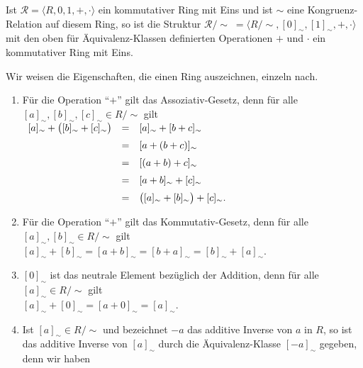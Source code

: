\begin{Satz} \label{satz:faktor_ring} 
  Ist $\mathcal{R} = \langle R, 0, 1, +, \cdot \rangle$ ein kommutativer Ring mit Eins und ist
  $\sim$ eine Kongruenz-Relation auf diesem Ring, so ist die Struktur 
  $\mathcal{R}/\!\!\sim\; = \langle R/\!\sim, [0]_\sim, [1]_\sim, +, \cdot \rangle$
  mit den oben für Äquivalenz-Klassen definierten Operationen $+$ und $\cdot$ ein kommutativer 
  Ring mit Eins. 
\end{Satz}

\proof
Wir weisen die Eigenschaften, die einen Ring auszeichnen, einzeln nach.
\begin{enumerate}
\item Für die Operation ``$+$'' gilt das Assoziativ-Gesetz, denn für alle 
      $[a]_\sim, [b]_\sim, [c]_\sim \in R/\!\sim$ gilt
      \\[0.2cm]
      \hspace*{1.3cm}
      $
      \begin{array}[t]{lcl}
            [a]_\sim + \bigl([b]_\sim + [c]_\sim\bigr) 
      & = & [a]_\sim + [b + c]_\sim                     \\[0.2cm]
      & = & [a + (b + c)]_\sim                          \\[0.2cm]
      & = & [(a + b) + c]_\sim                          \\[0.2cm]
      & = & [a + b]_\sim + [c]_\sim                     \\[0.2cm]
      & = & \bigl([a]_\sim + [b]_\sim\bigr) + [c]_\sim. 
      \end{array}
      $
\item Für die Operation ``$+$'' gilt das Kommutativ-Gesetz, denn für alle $[a]_\sim, [b]_\sim \in R/\!\sim$ gilt
      \\[0.2cm]
      \hspace*{1.3cm}
      $[a]_\sim + [b]_\sim = [a + b]_\sim = [b + a]_\sim = [b]_\sim + [a]_\sim$.
\item $[0]_\sim$ ist das neutrale Element bezüglich der Addition, denn für alle $[a]_\sim \in R/\!\sim$ gilt
      \\[0.2cm]
      \hspace*{1.3cm}
      $[a]_\sim + [0]_\sim = [a + 0]_\sim = [a]_\sim$.
\item Ist $[a]_\sim \in R/\!\sim$ und bezeichnet $-a$ das additive Inverse von $a$ in $R$, so ist das
      additive Inverse von  $[a]_\sim$ durch 
      die Äquivalenz-Klasse $[-a]_\sim$ gegeben, denn wir haben
      \\[0.2cm]

\end{enumerate}
